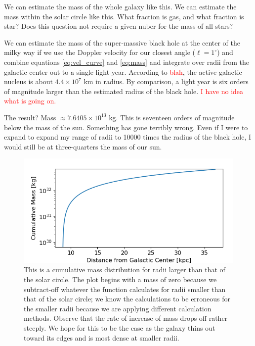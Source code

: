 \documentclass[12pt]{article}
\begin{document}
\quad \quad We can estimate the mass of the whole galaxy like this. We can estimate the mass within the solar circle like this. What fraction is gas, and what fraction is star? Does this question not require a given nuber for the mass of all stars?

We can estimate the mass of the super-massive black hole at the center of the milky way if we use the Doppler velocity for our closest angle ($\ell = 1^\circ$) and combine equations \ref{eq:vel_curve} and \ref{eq:mass} and integrate over radii from the galactic center out to a single light-year. According to \textcolor{red}{blah}, the active galactic nucleus is about $4.4 \times 10^{7}$ km in radius. By comparison, a light year is six orders of magnitude larger than the estimated radius of the black hole. \textcolor{red}{I have no idea what is going on.}

The result? Mass $\approx 7.6405 \times 10^{13}$ kg. This is seventeen orders of magnitude below the mass of the sun. Something has gone terribly wrong. Even if I were to expand to expand my range of radii to 10000 times the radius of the black hole, I would still be at three-quarters the mass of our sun. 

\begin{figure}
	\centering
	\includegraphics[width=.8\linewidth]{outer_mass_distro}
	\caption{This is a cumulative mass distribution for radii larger than that of the solar circle. The plot begins with a mass of zero because we subtract-off whatever the function calculates for radii smaller than that of the solar circle; we know the calculations to be erroneous for the smaller radii because we are applying different calculation methods. Observe that the rate of increase of mass drops off rather steeply. We hope for this to be the case as the galaxy thins out toward its edges and is most dense at smaller radii.}
	\label{fig:outer_mass_distro}
\end{figure}
\end{document}
